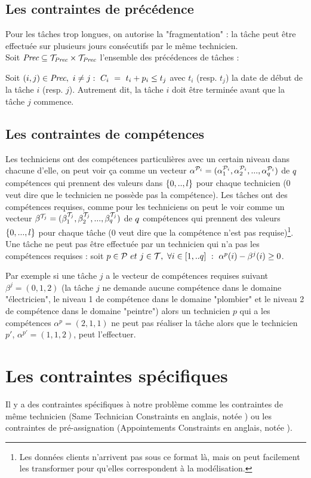 \subsection{Les contraintes de précédence}
Pour les tâches trop longues, on autorise la "fragmentation" : la tâche peut être effectuée sur plusieurs jours consécutifs par le même technicien.\\
Soit $\textit{Prec} \subseteq \mathcal{T}_{\textit{Prec}}\times \mathcal{T}_{\textit{Prec}}$ l'ensemble des précédences de tâches :

Soit $(i,j) \in \textit{Prec},~ i \not= j :~ C_i~=~t_i + p_i\leq t_j$ avec $t_i$ (resp. $t_j$) la date de début de la tâche $i$ (resp. $j$). Autrement dit, la tâche $i$ doit être terminée avant que la tâche $j$ commence.

\subsection{Les contraintes de compétences}
Les techniciens ont des compétences particulières avec un certain niveau dans chacune d'elle, on peut voir ça comme un vecteur $\alpha^{\mathcal{P}_i}=(\alpha^{\mathcal{P}_i}_1,\alpha^{\mathcal{P}_i}_2,...,\alpha^{\mathcal{P}_i}_q)$  de $q$ compétences qui prennent des valeurs dans $\{0,..,l\}$  pour chaque technicien ($0$ veut dire que le technicien ne possède pas la compétence). Les tâches ont des compétences requises, comme pour les techniciens on peut le voir comme un vecteur $\beta^{\mathcal{T}_j}=(\beta^{\mathcal{T}_j}_1,\beta^{\mathcal{T}_j}_2,...,\beta^{\mathcal{T}_j}_q)$ de $q$ compétences qui prennent des valeurs $\{0,...,l\}$ pour chaque tâche (0 veut dire que la compétence n'est pas requise)\footnote{Les données clients n'arrivent pas sous ce format là, mais on peut facilement les transformer pour qu'elles correspondent à la modélisation.}. Une tâche ne peut pas être effectuée par un technicien qui n'a pas les compétences requises : soit $p\in \mathcal{P} ~et~ j \in \mathcal{T},~ \forall i\in[1,..q] ~:~ \alpha^{p}(i)-\beta^{j}(i) \geq 0$.

Par exemple si une tâche $j$ a le vecteur de compétences requises suivant $\beta^j=(0,1,2)$ (la tâche $j$ ne demande aucune compétence dans le domaine "électricien", le niveau 1 de compétence dans le domaine "plombier" et le niveau 2 de compétence dans le domaine "peintre") alors un technicien $p$ qui a les compétences $\alpha^p=(2,1,1)$ ne peut pas réaliser la tâche alors que le technicien $p'$, $\alpha^{p'}=(1,1,2)$, peut l'effectuer.

\section{Les contraintes spécifiques}
Il y a des contraintes spécifiques à notre problème comme les contraintes de même technicien (Same Technician Constraints en anglais, notée \same) ou les contraintes de pré-assignation (Appointements Constraints en anglais, notée \app). 

